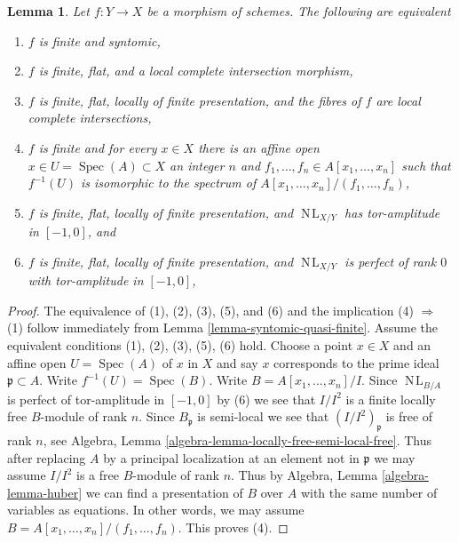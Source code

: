 \documentclass[10pt,a4paper]{amsart}
\theoremstyle{plain}
\newtheorem{lemma}[subsection]{Lemma}
\theoremstyle{definition}
\theoremstyle{remark}
\numberwithin{equation}{subsection}
\def\Spec{\mathop{\mathrm{Spec}}}
\def\NL{\mathop{N\!L}\nolimits}
\begin{document}
\begin{lemma}
\label{lemma-syntomic-finite}
Let $f : Y \to X$ be a morphism of schemes. The following are equivalent
\begin{enumerate}
\item $f$ is finite and syntomic,
\item $f$ is finite, flat, and a local complete intersection morphism,
\item $f$ is finite, flat, locally of finite presentation,
and the fibres of $f$ are local complete intersections,
\item $f$ is finite and for every $x \in X$ there is an
affine open $x \in U = \Spec(A) \subset X$ an integer $n$
and $f_1, \ldots, f_n \in A[x_1, \ldots, x_n]$ such that
$f^{-1}(U)$ is isomorphic to the spectrum of
$A[x_1, \ldots, x_n]/(f_1, \ldots, f_n)$,
\item $f$ is finite, flat, locally of finite presentation,
and $\NL_{X/Y}$ has tor-amplitude in $[-1, 0]$, and
\item $f$ is finite, flat, locally of finite presentation, and
$\NL_{X/Y}$ is perfect of rank $0$ with tor-amplitude in $[-1, 0]$,
\end{enumerate}
\end{lemma}

\begin{proof}
The equivalence of (1), (2), (3), (5), and (6)
and the implication (4) $\Rightarrow$ (1) follow immediately
from Lemma \ref{lemma-syntomic-quasi-finite}. Assume the equivalent conditions
(1), (2), (3), (5), (6) hold.
Choose a point $x \in X$ and an affine open $U = \Spec(A)$
of $x$ in $X$ and say $x$ corresponds to the prime ideal
$\mathfrak p \subset A$. Write $f^{-1}(U) = \Spec(B)$.
Write $B = A[x_1, \ldots, x_n]/I$. Since $\NL_{B/A}$
is perfect of tor-amplitude in $[-1, 0]$ by (6)
we see that $I/I^2$ is a finite locally free $B$-module
of rank $n$. Since $B_\mathfrak p$ is semi-local we see that
$(I/I^2)_\mathfrak p$ is free of rank $n$, see
Algebra, Lemma \ref{algebra-lemma-locally-free-semi-local-free}.
Thus after replacing $A$ by a principal localization at
an element not in $\mathfrak p$ we may assume $I/I^2$
is a free $B$-module of rank $n$.
Thus by Algebra, Lemma \ref{algebra-lemma-huber}
we can find a presentation of $B$ over $A$
with the same number of variables as equations. In other words,
we may assume $B = A[x_1, \ldots, x_n]/(f_1, \ldots, f_n)$.
This proves (4).
\end{proof}
\end{document}
